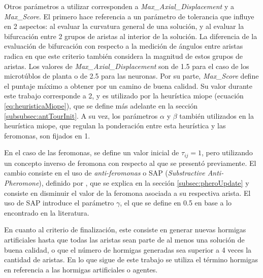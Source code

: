 Otros par\'ametros a utilizar corresponden a {\it Max\_Axial\_Displacement} y a {\it Max\_Score}. El primero hace referencia a un par\'ametro de tolerancia que influye en 2 aspectos: al evaluar la curvatura general de una soluci\'on, y al evaluar la bifurcaci\'on entre 2 grupos de aristas al interior de la soluci\'on. La diferencia de la evaluaci\'on de bifurcaci\'on con respecto a la medici\'on de \'angulos entre aristas radica en que este criterio tambi\'en considera la magnitud de estos grupos de aristas. Los valores de {\it Max\_Axial\_Displacement} son de 1.5 para el caso de los microt\'ublos de planta o de 2.5 para las neuronas. Por su parte, {\it Max\_Score} define el puntaje m\'aximo a obtener por un camino de buena calidad. Su valor durante este trabajo corresponde a 2, y es utilizado por la heur\'istica miope (ecuaci\'on \ref{eq:heuristicaMiope}), que se define m\'as adelante en la secci\'on \ref{subsubsec:antTourInit}. A su vez, los par\'ametros $\alpha$ y $\beta$ tambi\'en utilizados en la heur\'istica miope, que regulan la ponderaci\'on entre esta heur\'istica y las feromonas, son fijados en 1.


En el caso de las feromonas, se define un valor inicial de $\tau_{ij} = 1$, pero utilizando un concepto inverso de feromona con respecto al que se present\'o previamente. El cambio consiste en el uso de {\it anti-feromonas} o SAP ({\it Substractive Anti-Pheromone}), definido por \citet{montgomery2002anti}, que se explica en la secci\'on \ref{subsec:pheroUpdate} y consiste en disminuir el valor de la feromona asociada a su respectiva arista. El uso de SAP introduce el par\'ametro $\gamma$, el que se define en 0.5 en base a lo encontrado en la literatura.


En cuanto al criterio de finalizaci\'on, este consiste en generar nuevas hormigas artificiales hasta que todas las aristas sean parte de al menos una soluci\'on de buena calidad, o que el n\'umero de hormigas generadas sea superior a 4 veces la cantidad de aristas. En lo que sigue de este trabajo se utiliza el t\'ermino hormigas en referencia a las hormigas artificiales o agentes.


